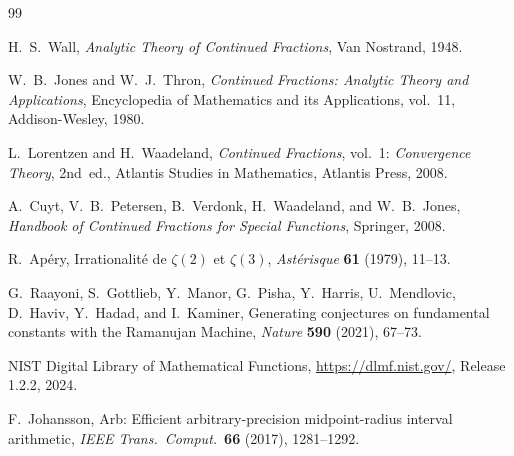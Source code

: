 \documentclass[11pt]{article}
\theoremstyle{definition}
\theoremstyle{remark}
\begin{document}
\begin{thebibliography}{99}

H.~S.~Wall,
\emph{Analytic Theory of Continued Fractions},
Van Nostrand, 1948.

W.~B.~Jones and W.~J.~Thron,
\emph{Continued Fractions: Analytic Theory and Applications},
Encyclopedia of Mathematics and its Applications, vol.~11,
Addison-Wesley, 1980.

L.~Lorentzen and H.~Waadeland,
\emph{Continued Fractions}, vol.~1: \emph{Convergence Theory},
2nd~ed., Atlantis Studies in Mathematics, Atlantis Press, 2008.

A.~Cuyt, V.~B.~Petersen, B.~Verdonk, H.~Waadeland, and W.~B.~Jones,
\emph{Handbook of Continued Fractions for Special Functions},
Springer, 2008.

R.~Ap\'ery,
Irrationalit\'e de $\zeta(2)$ et $\zeta(3)$,
\emph{Ast\'erisque} \textbf{61} (1979), 11--13.

G.~Raayoni, S.~Gottlieb, Y.~Manor, G.~Pisha, Y.~Harris, U.~Mendlovic,
D.~Haviv, Y.~Hadad, and I.~Kaminer,
Generating conjectures on fundamental constants with the
Ramanujan Machine,
\emph{Nature} \textbf{590} (2021), 67--73.

NIST Digital Library of Mathematical Functions,
\url{https://dlmf.nist.gov/}, Release 1.2.2, 2024.

F.~Johansson,
Arb: Efficient arbitrary-precision midpoint-radius interval
arithmetic, \emph{IEEE Trans.\ Comput.}\ \textbf{66} (2017),
1281--1292.

\end{thebibliography}
\end{document}
